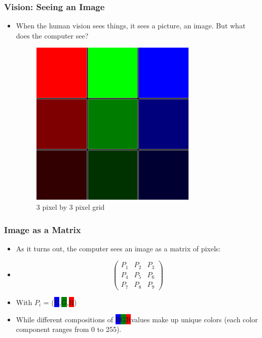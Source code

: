 \documentclass{beamer}
\begin{document}
	
	\begin{frame}
	\frametitle{Vision: Seeing an Image}
		\begin{itemize}
			\item When the human vision sees things, it sees a picture, an image. But what does the computer see?
			
			\begin{figure}
				\includegraphics[scale = 0.5]{colors}
				\caption{3 pixel by 3 pixel grid}
			\end{figure}
		\end{itemize}
	\end{frame}
	
	
	
	
	\begin{frame}
	\frametitle{Image as a Matrix}
		\begin{itemize}
			\item As it turns out, the computer sees an image as a matrix of pixels:
		
			\item \[
			\left( \begin{array}{ccc}
			P_{1} & P_{2} & P_{3} \\
			P_{4} & P_{5} & P_{6} \\
			P_{7} & P_{8} & P_{9}
			\end{array} \right)
			\]
		
			\item With $P_{i}$ = (\colorbox{blue}{B},\colorbox{green}{G},\colorbox{red}{R})
		
			\item While different compositions of \colorbox{blue}{B}\colorbox{green}{G}\colorbox{red}{R}values make up unique colors (each color component ranges from 0 to 255).
		\end{itemize}
	\end{frame}
	
\end{document}
